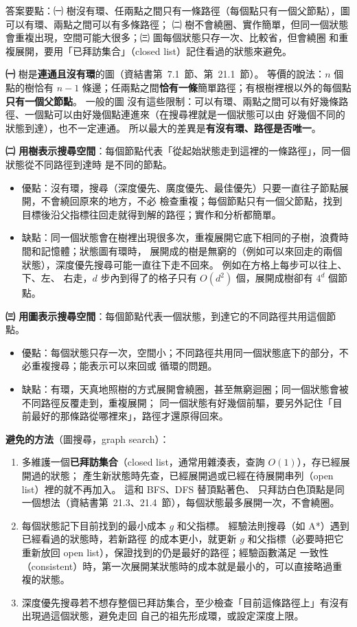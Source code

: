 \begin{pastsoln}
答案要點：㈠ 樹沒有環、任兩點之間只有一條路徑（每個點只有一個父節點），圖可以有環、兩點之間可以有多條路徑；
㈡ 樹不會繞圈、實作簡單，但同一個狀態會重複出現，空間可能大很多；㈢ 圖每個狀態只存一次、比較省，但會繞圈
和重複展開，要用「已拜訪集合」（closed list）記住看過的狀態來避免。

\textbf{㈠} 樹是\textbf{連通且沒有環}的圖（資結書第~7.1~節、第~21.1~節）。 等價的說法：$n$ 個點的樹恰有
$n - 1$ 條邊；任兩點之間\textbf{恰有一條}簡單路徑；有根樹裡根以外的每個點\textbf{只有一個父節點}。 一般的圖
沒有這些限制：可以有環、兩點之間可以有好幾條路徑、一個點可以由好幾個點連進來（在搜尋裡就是一個狀態可以由
好幾個不同的狀態到達），也不一定連通。 所以最大的差異是\textbf{有沒有環、路徑是否唯一}。

\textbf{㈡ 用樹表示搜尋空間}：每個節點代表「從起始狀態走到這裡的一條路徑」，同一個狀態從不同路徑到達時
是不同的節點。
\begin{itemize}
\item 優點：沒有環，搜尋（深度優先、廣度優先、最佳優先）只要一直往子節點展開，不會繞回原來的地方，不必
檢查重複；每個節點只有一個父節點，找到目標後沿父指標往回走就得到解的路徑；實作和分析都簡單。
\item 缺點：同一個狀態會在樹裡出現很多次，重複展開它底下相同的子樹，浪費時間和記憶體；狀態圖有環時，
展開成的樹是無窮的（例如可以來回走的兩個狀態），深度優先搜尋可能一直往下走不回來。 例如在方格上每步可以往上、下、左、
右走，$d$ 步內到得了的格子只有 $O(d^2)$ 個，展開成樹卻有 $4^d$ 個節點。
\end{itemize}

\textbf{㈢ 用圖表示搜尋空間}：每個節點代表一個狀態，到達它的不同路徑共用這個節點。
\begin{itemize}
\item 優點：每個狀態只存一次，空間小；不同路徑共用同一個狀態底下的部分，不必重複搜尋；能表示可以來回或
循環的問題。
\item 缺點：有環，天真地照樹的方式展開會繞圈，甚至無窮迴圈；同一個狀態會被不同路徑反覆走到，重複展開；
同一個狀態有好幾個前驅，要另外記住「目前最好的那條路從哪裡來」，路徑才還原得回來。
\end{itemize}
\textbf{避免的方法}（圖搜尋，graph search）：
\begin{enumerate}[label=(\arabic*)]
\item 多維護一個\textbf{已拜訪集合}（closed list，通常用雜湊表，查詢 $O(1)$），存已經展開過的狀態；
產生新狀態時先查，已經展開過或已經在待展開串列（open list）裡的就不再加入。 這和 BFS、DFS 替頂點著色、
只拜訪白色頂點是同一個想法（資結書第~21.3、21.4~節），每個狀態最多展開一次，不會繞圈。
\item 每個狀態記下目前找到的最小成本 $g$ 和父指標。 經驗法則搜尋（如 A*）遇到已經看過的狀態時，若新路徑
的成本更小，就更新 $g$ 和父指標（必要時把它重新放回 open list），保證找到的仍是最好的路徑；經驗函數滿足
一致性（consistent）時，第一次展開某狀態時的成本就是最小的，可以直接略過重複的狀態。
\item 深度優先搜尋若不想存整個已拜訪集合，至少檢查「目前這條路徑上」有沒有出現過這個狀態，避免走回
自己的祖先形成環，或設定深度上限。
\end{enumerate}
\end{pastsoln}
